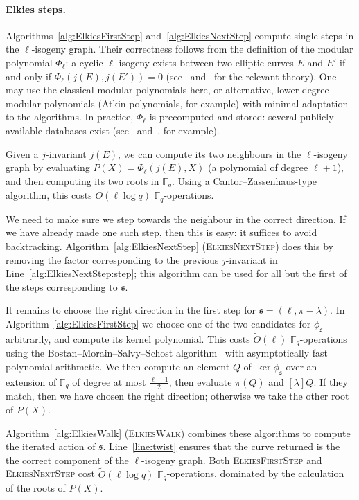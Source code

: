 \documentclass{llncs}
\newcommand{\F}{\mathbb{F}}
\newcommand{\softO}{\tilde{O}}
\newcommand{\algstyle}[1]{\textsc{#1}}
\renewcommand{\frak}{\mathfrak}
\begin{document}
\paragraph{Elkies steps.}
Algorithms~\ref{alg:ElkiesFirstStep}
and~\ref{alg:ElkiesNextStep} 
compute single steps in the $\ell$-isogeny graph.
Their correctness
follows from the definition of the modular polynomial $\Phi_\ell$:
a cyclic $\ell$-isogeny exists between two elliptic
curves $E$ and $E'$ if and only if $\Phi_\ell(j(E), j(E')) = 0$
(see~\cite[\S6]{schoof95} and~\cite[\S3]{Elkies98} for the relevant theory).
One may use the classical modular polynomials here,
or alternative, lower-degree modular polynomials
(Atkin polynomials, for example)
with minimal adaptation to the algorithms.
In practice, $\Phi_\ell$ is precomputed and stored:
several publicly available databases exist
(see~\cite{Echidna} and~\cite{SutherlandDatabase,BrokerLS12,BruinierOS16}, for example).

Given a $j$-invariant $j(E)$,
we can compute its two neighbours in the $\ell$-isogeny graph
by evaluating $P(X) = \Phi_\ell(j(E),X)$
(a polynomial of degree $\ell+1$),
and then computing its two roots in $\F_q$.
Using a Cantor--Zassenhaus-type algorithm,
this costs
$\softO(\ell\log q)$ $\F_q$-operations.

We need to make sure we step towards the neighbour in the correct direction.
If we have already made one such step, then this is easy:
it suffices to avoid backtracking.
Algorithm~\ref{alg:ElkiesNextStep} (\algstyle{ElkiesNextStep})
does this by
removing the factor corresponding to the previous $j$-invariant 
in Line~\ref{alg:ElkiesNextStep:step};
this algorithm can be used for all but the first of the steps
corresponding to $\frak{s}$.

It remains to choose the right direction in the first step 
for $\frak{s} = (\ell,\pi-\lambda)$.
In Algorithm~\ref{alg:ElkiesFirstStep}
we choose one of the two candidates for $\phi_{\frak s}$ arbitrarily,
and compute its kernel polynomial.
This costs $\softO(\ell)$ $\F_q$-operations
using the Bostan--Morain--Salvy--Schost algorithm~\cite{BMSS08}
with asymptotically fast polynomial arithmetic.
We then compute an element $Q$ of $\ker\phi_\frak{s}$
over an extension of $\F_q$ of degree at most $\frac{\ell-1}{2}$,
then evaluate $\pi(Q)$ and $[\lambda]Q$.
If they match, then we have chosen the right direction;
otherwise we take the other root of $P(X)$.

Algorithm~\ref{alg:ElkiesWalk} (\algstyle{ElkiesWalk}) 
combines these algorithms
to compute the iterated action of $\frak{s}$.
Line~\ref{line:twist} ensures that the curve returned
is the the correct component of the $\ell$-isogeny graph.
Both \algstyle{ElkiesFirstStep} and \algstyle{ElkiesNextStep}
cost $\softO(\ell\log q)$ $\F_q$-operations,
dominated by the calculation of the roots of $P(X)$.
\end{document}
